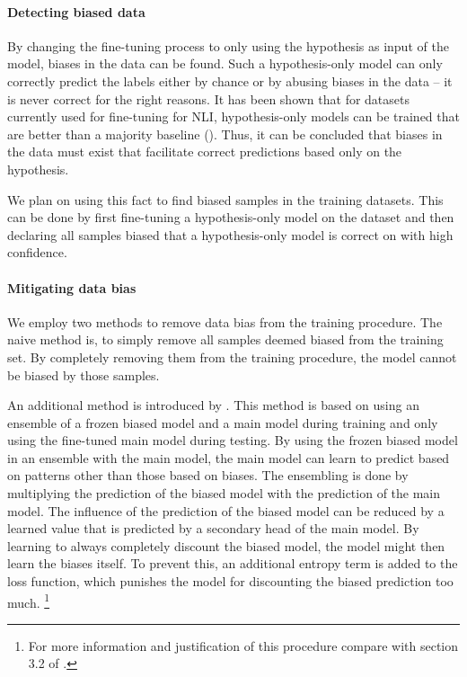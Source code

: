 \documentclass[12pt,a4paper]{article}
\begin{document}
\paragraph{Detecting biased data}

By changing the fine-tuning process to only using the hypothesis as input of the model, biases in the data can be found. Such a hypothesis-only model can only correctly predict the labels either by chance or by abusing biases in the data -- it is never correct for the right reasons. It has been shown that for datasets currently used for fine-tuning for \acs{NLI}, hypothesis-only models can be trained that are better than a majority baseline (\cite{hyponly}). Thus, it can be concluded that biases in the data must exist that facilitate correct predictions based only on the hypothesis.

We plan on using this fact to find biased samples in the training datasets. This can be done by first fine-tuning a hypothesis-only model on the dataset and then declaring all samples biased that a hypothesis-only model is correct on with high confidence.

\paragraph{Mitigating data bias}

We employ two methods to remove data bias from the training procedure. The naive method is, to simply remove all samples deemed biased from the training set. By completely removing them from the training procedure, the model cannot be biased by those samples.

An additional method is introduced by \cite{clark2019don}. This method is based on using an ensemble of a frozen biased model and a main model during training and only using the fine-tuned main model during testing. By using the frozen biased model in an ensemble with the main model, the main model can learn to predict based on patterns other than those based on biases. The ensembling is done by multiplying the prediction of the biased model with the prediction of the main model. The influence of the prediction of the biased model can be reduced by a learned value that is predicted by a secondary head of the main model. By learning to always completely discount the biased model, the model might then learn the biases itself. To prevent this, an additional entropy term is added to the loss function, which punishes the model for discounting the biased prediction too much. \footnote{For more information and justification of this procedure compare with section 3.2 of \cite{clark2019don}.}
\end{document}
